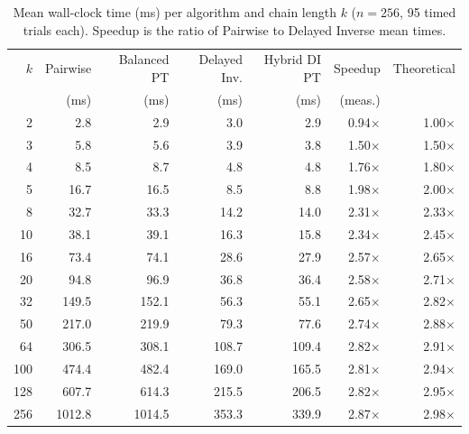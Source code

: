 \begin{table}[H]
\centering
\small
\begin{tabular}{r r r r r r r}
\hline
$k$ & Pairwise & Balanced PT & Delayed Inv. & Hybrid DI PT & Speedup & Theoretical \\
 & (ms) & (ms) & (ms) & (ms) & (meas.) & \\
\hline
2 & 2.8 & 2.9 & 3.0 & 2.9 & 0.94$\times$ & 1.00$\times$ \\
3 & 5.8 & 5.6 & 3.9 & 3.8 & 1.50$\times$ & 1.50$\times$ \\
4 & 8.5 & 8.7 & 4.8 & 4.8 & 1.76$\times$ & 1.80$\times$ \\
5 & 16.7 & 16.5 & 8.5 & 8.8 & 1.98$\times$ & 2.00$\times$ \\
8 & 32.7 & 33.3 & 14.2 & 14.0 & 2.31$\times$ & 2.33$\times$ \\
10 & 38.1 & 39.1 & 16.3 & 15.8 & 2.34$\times$ & 2.45$\times$ \\
16 & 73.4 & 74.1 & 28.6 & 27.9 & 2.57$\times$ & 2.65$\times$ \\
20 & 94.8 & 96.9 & 36.8 & 36.4 & 2.58$\times$ & 2.71$\times$ \\
32 & 149.5 & 152.1 & 56.3 & 55.1 & 2.65$\times$ & 2.82$\times$ \\
50 & 217.0 & 219.9 & 79.3 & 77.6 & 2.74$\times$ & 2.88$\times$ \\
64 & 306.5 & 308.1 & 108.7 & 109.4 & 2.82$\times$ & 2.91$\times$ \\
100 & 474.4 & 482.4 & 169.0 & 165.5 & 2.81$\times$ & 2.94$\times$ \\
128 & 607.7 & 614.3 & 215.5 & 206.5 & 2.82$\times$ & 2.95$\times$ \\
256 & 1012.8 & 1014.5 & 353.3 & 339.9 & 2.87$\times$ & 2.98$\times$ \\
\hline
\end{tabular}
\caption{Mean wall-clock time (ms) per algorithm and chain length $k$ ($n = 256$, 95 timed trials each). Speedup is the ratio of Pairwise to Delayed Inverse mean times.}
\label{tab:exp1_times}
\end{table}
